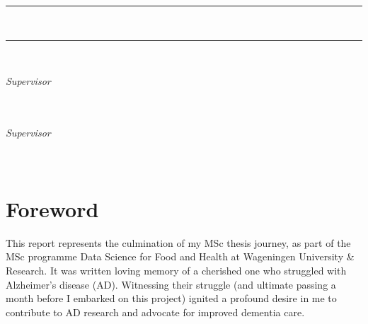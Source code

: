 \documentclass{amsart}
\newcommand{\frontmatter}{
    \pagenumbering{roman}   %
}
\begin{document}
\begin{titlepage}
\vspace{1cm}
\begin{center}
\par
\noindent
\rule[0.2cm]{\linewidth}{1.5pt}
\Huge
\textbf{\thesisTitle}
\vspace{0.2cm}
\LARGE
\par
\noindent
\thesisSubTitle\\
\rule[0.2cm]{\linewidth}{1.5pt}
\Large
\end{center}


\vspace{2cm}
\noindent
\LARGE
\thesisAuthor\\
\vspace{.2 cm}
\small
\par \noindent
\thesisDegree
\par \noindent
\university
\par \noindent
\thesisPlaceDate


\vspace{4cm}
\begin{flushright}
\emph{Supervisor} \\
\textbf{\supervisor} \\
\departmentSUP\\
\universitySUP
\end{flushright}

\vspace{.5cm}
\begin{flushright}
\emph{Supervisor} \\
\textbf{\cosupervisor} \\
\departmentCOSUP \\
\universityCOSUP
\end{flushright}
\end{titlepage}
\frontmatter
\section*{Foreword}
This report represents the culmination of my MSc thesis journey, as part of the MSc programme Data Science for Food and Health at Wageningen University \& Research. It was written loving memory of a cherished one who struggled with Alzheimer's disease (AD). Witnessing their struggle (and ultimate passing a month before I embarked on this project) ignited a profound desire in me to contribute to AD research and advocate for improved dementia care.
\end{document}
